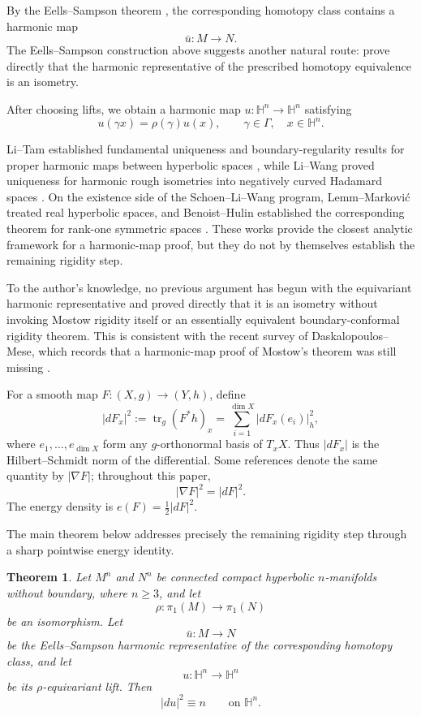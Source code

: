 \documentclass[11pt]{amsart}
\theoremstyle{plain}
\newtheorem{theorem}{Theorem}[section]
\theoremstyle{plain}
\theoremstyle{plain}
\newcommand{\Hn}{\mathbb H^n}
\numberwithin{equation}{section}
\begin{document}
By the Eells--Sampson theorem \cite[\S11A]{EellsSampson}, the corresponding homotopy class contains a harmonic map
\[
\bar u:M\longrightarrow N.
\]
The Eells--Sampson construction above suggests another natural route:
prove directly that the harmonic representative of the prescribed
homotopy equivalence is an isometry.

After choosing lifts, we obtain a harmonic map $u:\Hn\longrightarrow\Hn$ satisfying
\begin{equation}\label{eq:equivariance}
u(\gamma x)=\rho(\gamma)u(x),
\qquad
\gamma\in\Gamma,
\quad x\in\Hn.
\end{equation}

Li--Tam established fundamental
uniqueness and boundary-regularity results for proper harmonic maps
between hyperbolic spaces \cite{LiTam,LiTamII}, while Li--Wang proved
uniqueness for harmonic rough isometries into negatively curved Hadamard
spaces \cite{LiWang}.  On the existence side of the Schoen--Li--Wang
program, Lemm--Markovi\'c treated real hyperbolic spaces, and
Benoist--Hulin established the corresponding theorem for rank-one
symmetric spaces \cite{LemmMarkovic,BenoistHulin}.  These works provide the closest analytic framework for a harmonic-map
proof, but they do not by themselves establish the remaining rigidity
step.

To the author's knowledge, no previous argument has begun with the
equivariant harmonic representative and proved directly that it is an
isometry without invoking Mostow rigidity itself or an essentially
equivalent boundary-conformal rigidity theorem.  This is consistent with
the recent survey of Daskalopoulos--Mese, which records that a harmonic-map
proof of Mostow's theorem was still missing
\cite[p.~104]{DaskalopoulosMese}.  

For a smooth map \(F:(X,g)\to(Y,h)\), define
\begin{equation}\label{eq:HS_norm_def}
|dF_x|^2:=\operatorname{tr}_g(F^*h)_x= \sum_{i=1}^{\dim X}|dF_x(e_i)|_h^2,
\end{equation}
where \(e_1,\dots,e_{\dim X}\) form any \(g\)-orthonormal basis of \(T_xX\).  Thus \(|dF_x|\) is the Hilbert--Schmidt norm of the
differential.  Some references denote the same quantity by
\(|\nabla F|\); throughout this paper,
\[
|\nabla F|^2=|dF|^2.
\]
The energy density is $e(F)=\frac12|dF|^2$. 


The main theorem below addresses
precisely the remaining rigidity step through a sharp pointwise energy
identity.

\begin{theorem}\label{thm:main}
Let \(M^n\) and \(N^n\) be connected compact hyperbolic
\(n\)-manifolds without boundary, where \(n\geq3\), and let
\[
\rho:\pi_1(M)\longrightarrow\pi_1(N)
\]
be an isomorphism.  Let
\[
\bar u:M\longrightarrow N
\]
be the Eells--Sampson harmonic representative of the corresponding
homotopy class, and let
\[
u:\mathbb H^n\longrightarrow\mathbb H^n
\]
be its \(\rho\)-equivariant lift.  Then
\[
|du|^2\equiv n
\qquad\text{on }\mathbb H^n.
\]
\end{theorem}
\end{document}
